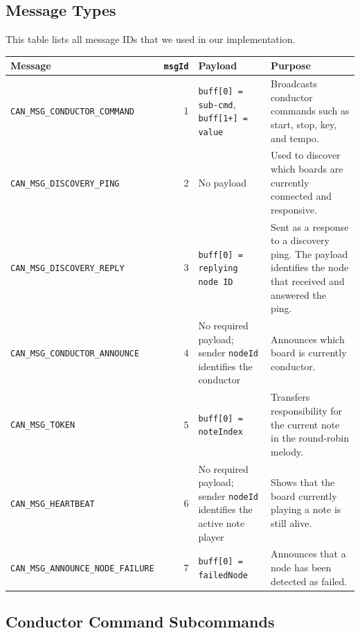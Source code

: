 \documentclass[11pt,a4paper]{article}
\begin{document}
\subsection*{Message Types}

This table lists all message IDs that we used in our implementation.

\begin{center}
\small
\setlength{\tabcolsep}{4pt}
\renewcommand{\arraystretch}{1.2}
\begin{tabularx}{\textwidth}{>{\raggedright\arraybackslash}p{}r>{\raggedright\arraybackslash}X>{\raggedright\arraybackslash}X}
\toprule
\textbf{Message} & \textbf{\texttt{msgId}} & \textbf{Payload} & \textbf{Purpose} \\
\midrule
\texttt{CAN\_\allowbreak{}MSG\_\allowbreak{}CONDUCTOR\_\allowbreak{}COMMAND} & 1 & \texttt{buff[0] = sub-cmd}, \texttt{buff[1+] = value} & Broadcasts conductor commands such as start, stop, key, and tempo. \\
\texttt{CAN\_\allowbreak{}MSG\_\allowbreak{}DISCOVERY\_\allowbreak{}PING} & 2 & No payload & Used to discover which boards are currently connected and responsive. \\
\texttt{CAN\_\allowbreak{}MSG\_\allowbreak{}DISCOVERY\_\allowbreak{}REPLY} & 3 & \texttt{buff[0] = replying node ID} & Sent as a response to a discovery ping. The payload identifies the node that received and answered the ping. \\
\texttt{CAN\_\allowbreak{}MSG\_\allowbreak{}CONDUCTOR\_\allowbreak{}ANNOUNCE} & 4 & No required payload; sender \texttt{nodeId} identifies the conductor & Announces which board is currently conductor. \\
\texttt{CAN\_\allowbreak{}MSG\_\allowbreak{}TOKEN} & 5 & \texttt{buff[0] = noteIndex} & Transfers responsibility for the current note in the round-robin melody. \\
\texttt{CAN\_\allowbreak{}MSG\_\allowbreak{}HEARTBEAT} & 6 & No required payload; sender \texttt{nodeId} identifies the active note player & Shows that the board currently playing a note is still alive. \\
\texttt{CAN\_\allowbreak{}MSG\_\allowbreak{}ANNOUNCE\_\allowbreak{}NODE\_\allowbreak{}FAILURE} & 7 & \texttt{buff[0] = failedNode} & Announces that a node has been detected as failed. \\
\bottomrule
\end{tabularx}
\end{center}

\subsection*{Conductor Command Subcommands}
\end{document}
